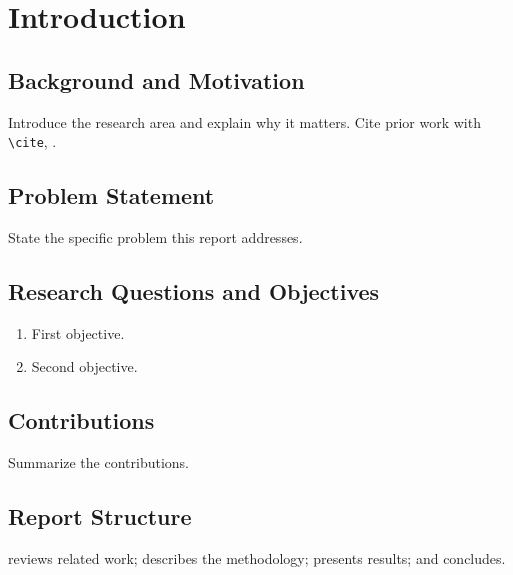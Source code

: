\chapter{Introduction}
\label{ch:introduction}

\section{Background and Motivation}
\label{sec:intro-background}

Introduce the research area and explain why it matters. Cite prior work
with \texttt{\textbackslash cite}, \eg \cite{example2020}.

\section{Problem Statement}
\label{sec:intro-problem}

State the specific problem this report addresses.

\section{Research Questions and Objectives}
\label{sec:intro-objectives}

\begin{enumerate}
  \item First objective.
  \item Second objective.
\end{enumerate}

\section{Contributions}
\label{sec:intro-contributions}

Summarize the contributions.

\section{Report Structure}
\label{sec:intro-structure}

 reviews related work; 
describes the methodology;  presents results; and
 concludes.

